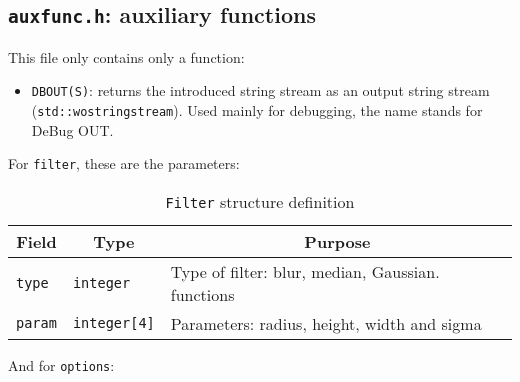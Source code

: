 \documentclass[a4paper,11pt]{memoir}
\begin{document}
\subsection{\texttt{auxfunc.h}: auxiliary functions}
This file only contains only a function:
\begin{itemize}
\item \texttt{DBOUT(S)}: returns the introduced string stream as an output string stream
(\texttt{std::wostringstream}). Used mainly for debugging, the name stands for DeBug
OUT.
\end{itemize}

For \texttt{filter}, these are the parameters:

\begin{table}[H]
\centering
\caption{\texttt{Filter} structure definition}
\label{my-label}
\begin{tabular}{|m{}|
m{}|
m{}|}
\hline
\multicolumn{1}{|c|}{\textbf{Field}} & \multicolumn{1}{|c|}{\textbf{Type}} & \multicolumn{1}{c|}{\textbf{Purpose}} \\ \hline
\texttt{type} & \texttt{integer} & Type of filter: blur, median, Gaussian. functions \\ \hline
\texttt{param} & \texttt{integer[4]} & Parameters: radius, height, width and sigma   \\ \hline
\end{tabular}
\end{table}

And for \texttt{options}:
\end{document}
